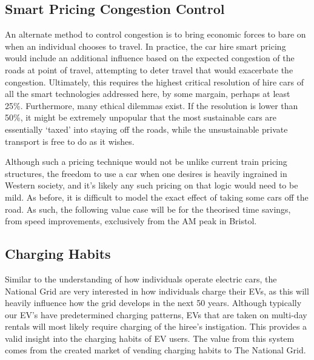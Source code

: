 \documentclass[conference]{IEEEtran}
\begin{document}
\subsection{Smart Pricing Congestion Control}

An alternate method to control congestion is to bring economic forces
to bare on when an individual chooses to travel. In practice, the car
hire smart pricing would include an additional influence based on the
expected congestion of the roads at point of travel, attempting to
deter travel that would exacerbate the congestion.  Ultimately, this
requires the highest critical resolution of hire cars of all the smart
technologies addressed here, by some margain, perhaps at least
25\%. Furthermore, many ethical dilemmas exist. If the resolution is
lower than 50\%, it might be extremely unpopular that the most
sustainable cars are essentially `taxed' into staying off the roads,
while the unsustainable private transport is free to do as it wishes.

Although such a pricing technique would not be unlike current train
pricing structures, the freedom to use a car when one desires is
heavily ingrained in Western society, and it’s likely any such pricing
on that logic would need to be mild. As before, it is difficult to
model the exact effect of taking some cars off the road. As such, the
following value case will be for the theorised time savings, from
speed improvements, exclusively from the AM peak in Bristol.


\subsection{Charging Habits}

Similar to the understanding of how individuals operate electric cars,
the National Grid are very interested in how individuals charge their
EVs, as this will heavily influence how the grid develops in the next
50 years.  Although typically our EV’s have predetermined charging
patterns, EVs that are taken on multi-day rentals will most likely
require charging of the hiree’s instigation. This provides a valid
insight into the charging habits of EV users.  The value from this
system comes from the created market of vending charging habits to The
National Grid.
\end{document}

